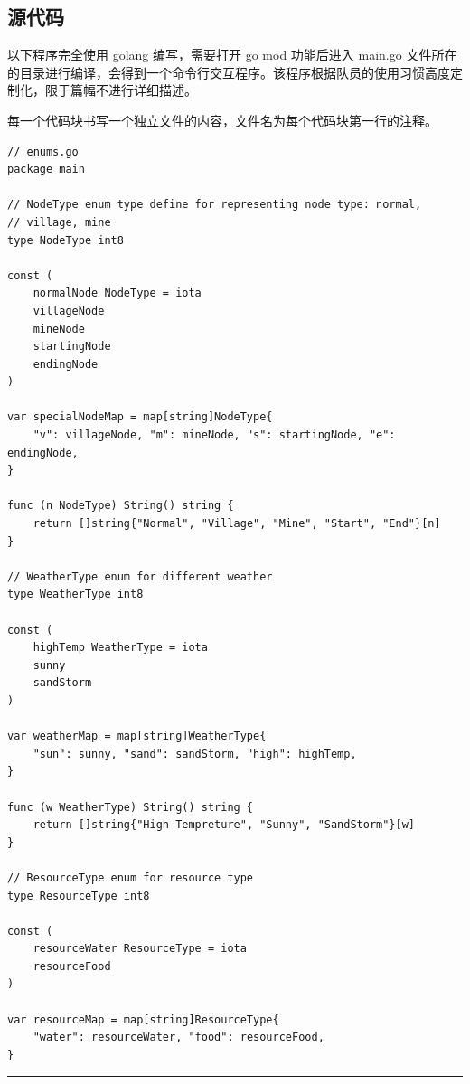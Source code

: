 \documentclass[a4paper]{ctexart}
\begin{document}
\subsection{源代码}

以下程序完全使用 golang 编写，需要打开 go mod 功能后进入 main.go 文件所在的目录进行编译，会得到一个命令行交互程序。该程序根据队员的使用习惯高度定制化，限于篇幅不进行详细描述。

每一个代码块书写一个独立文件的内容，文件名为每个代码块第一行的注释。

\begin{verbatim}
// enums.go
package main

// NodeType enum type define for representing node type: normal,
// village, mine
type NodeType int8

const (
    normalNode NodeType = iota
    villageNode
    mineNode
    startingNode
    endingNode
)

var specialNodeMap = map[string]NodeType{
    "v": villageNode, "m": mineNode, "s": startingNode, "e": endingNode,
}

func (n NodeType) String() string {
    return []string{"Normal", "Village", "Mine", "Start", "End"}[n]
}

// WeatherType enum for different weather
type WeatherType int8

const (
    highTemp WeatherType = iota
    sunny
    sandStorm
)

var weatherMap = map[string]WeatherType{
    "sun": sunny, "sand": sandStorm, "high": highTemp,
}

func (w WeatherType) String() string {
    return []string{"High Tempreture", "Sunny", "SandStorm"}[w]
}

// ResourceType enum for resource type
type ResourceType int8

const (
    resourceWater ResourceType = iota
    resourceFood
)

var resourceMap = map[string]ResourceType{
    "water": resourceWater, "food": resourceFood,
}
\end{verbatim}

\hrule
\end{document}
